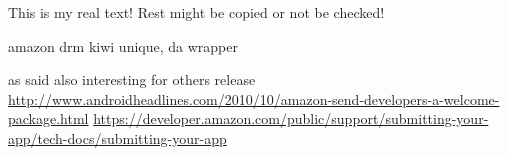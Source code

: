 This is my real text! Rest might be copied or not be checked!

amazon drm kiwi
unique, da wrapper

as said also interesting for others
release \url{http://www.androidheadlines.com/2010/10/amazon-send-developers-a-welcome-package.html}\newline
\url{https://developer.amazon.com/public/support/submitting-your-app/tech-docs/submitting-your-app}
